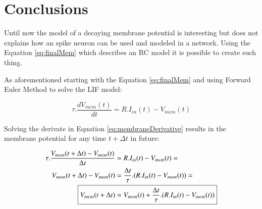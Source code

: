 \section{Conclusions}
\label{sec:conclusions}
			\par Until now the model of a decaying membrane potential is interesting but does not explains how an spike neuron can be used and modeled in a network. Using the Equation \ref{eq:finalMem} which describes an RC model it is possible to create such thing.

\par As aforementioned starting with the Equation \ref{eq:finalMem} and using Forward Euler Method to solve the LIF model:

\begin{equation}
	\tau.\dfrac{dV_{mem}(t)}{dt} = R.I_{in}(t) - V_{mem}(t)
\end{equation}

\par Solving the derivate in Equation \ref{eq:membraneDerivative} results in the membrane potential for any time $t+\Delta t$ in future:

\begin{equation}
	\label{eq:membraneDerivative}
	\begin{aligned}
		\tau.\dfrac{V_{mem}(t+\Delta t) - V_{mem}(t)}{\Delta t} &= R.I_{in}(t) - V_{mem}(t) = \\
		V_{mem}(t+\Delta t) - V_{mem}(t) &= \frac{\Delta t}{\tau} . (R.I_{in}(t) - V_{mem}(t)) = \\
		\Aboxed{V_{mem}(t+\Delta t) &= V_{mem}(t) + \frac{\Delta t}{\tau} . (R.I_{in}(t) - V_{mem}(t))}
	\end{aligned}
\end{equation}